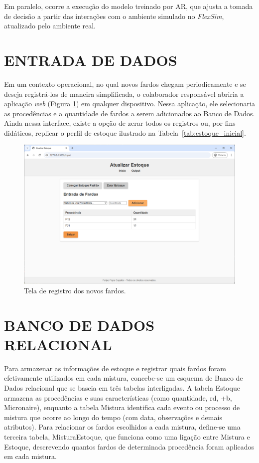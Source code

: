 \documentclass[
    12pt,                %
    openright,           %
    oneside,             %
    a4paper,             %
    english,             %
    spanish,             %
    brazil               %
]{ufscar}
\begin{document}
Em paralelo, ocorre a execução do modelo treinado por AR, que ajusta a tomada de decisão a partir das interações com o ambiente simulado no \textit{FlexSim}, atualizado pelo ambiente real.


\section{ENTRADA DE DADOS}

Em um contexto operacional, no qual novos fardos chegam periodicamente e se deseja registrá-los de maneira simplificada, o colaborador responsável abriria a aplicação \textit{web} (Figura \ref{figure:TelaInput}) em qualquer dispositivo. Nessa aplicação, ele selecionaria as procedências e a quantidade de fardos a serem adicionados ao Banco de Dados. Ainda nessa interface, existe a opção de zerar todos os registros ou, por fins didáticos, replicar o perfil de estoque ilustrado na Tabela~\ref{tab:estoque_inicial}.

\begin{figure}[hbt]
\centering
  \caption{Tela de registro dos novos fardos.}
  \label{figure:TelaInput}
  \includegraphics[width=1\textwidth]{figures/TelaInput.png}
\end{figure}

\section{BANCO DE DADOS RELACIONAL}

Para armazenar as informações de estoque e registrar quais fardos foram efetivamente utilizados em cada mistura, concebe-se um esquema de Banco de Dados relacional que se baseia em três tabelas interligadas. A tabela Estoque armazena as procedências e suas características (como quantidade, rd, +b, Micronaire), enquanto a tabela Mistura identifica cada evento ou processo de mistura que ocorre ao longo do tempo (com data, observações e demais atributos). Para relacionar os fardos escolhidos a cada mistura, define-se uma terceira tabela, MisturaEstoque, que funciona como uma ligação entre Mistura e Estoque, descrevendo quantos fardos de determinada procedência foram aplicados em cada mistura.
\end{document}
